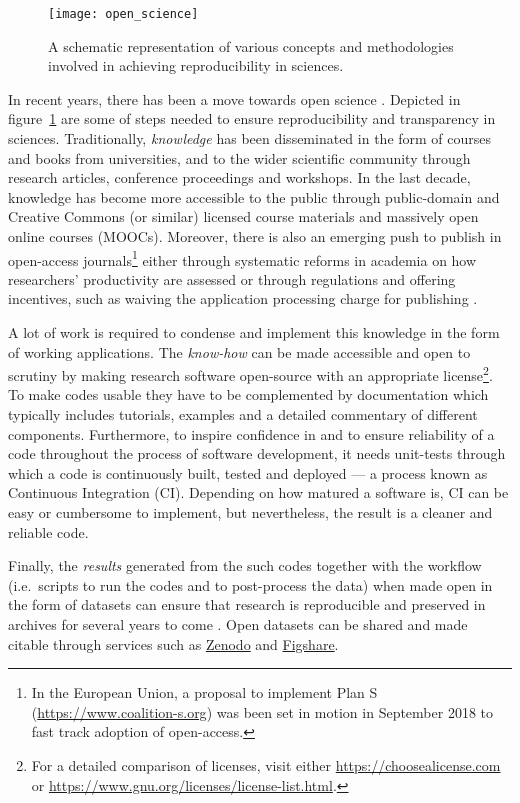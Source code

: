 \begin{figure}[h]
  \centering
  \texttt{[image: open\_science]}
  \caption{A schematic representation of various concepts and methodologies
  involved in achieving reproducibility in sciences.}\label{fig:opensci}
\end{figure}

In recent years, there has been a move towards open science
\citep[see the report by][]{royal_society_great_britain_science_2012}.
%
Depicted in figure~\ref{fig:opensci} are some of steps needed to ensure
reproducibility and transparency in sciences.
%
Traditionally, \emph{knowledge} has been disseminated in the form of courses
and books from universities, and to the wider scientific community through
research articles, conference proceedings and workshops.
%
In the last decade, knowledge has become more accessible to the public
through public-domain and Creative Commons (or similar) licensed course
materials and massively open online courses (MOOCs). Moreover, there is also an
emerging push to publish in open-access journals\footnote{In the European
  Union, a proposal to implement Plan S (\url{https://www.coalition-s.org}) was
  been set in motion in September 2018 to fast track adoption of open-access.
} either through systematic
reforms in academia on how researchers' productivity are assessed or through
regulations and offering incentives, such as waiving the application processing
charge for publishing \citep{nosek_promoting_2015}.

A lot of work is required to condense and implement this knowledge in the form
of working applications.
%
The \emph{know-how} can be made accessible and open to scrutiny by making
research software open-source with an appropriate license\footnote{For a
	detailed comparison of licenses, visit either
	\url{https://choosealicense.com} or
	\url{https://www.gnu.org/licenses/license-list.html}. }.
%
To make codes usable they have to be complemented by documentation which
typically includes tutorials, examples and a detailed commentary of different
components.
%
Furthermore, to inspire confidence in and to ensure reliability of a code
throughout the process of software development, it needs unit-tests through
which a code is continuously built, tested and deployed --- a process known as
Continuous Integration (CI). Depending on how matured a software is, CI can be
easy or cumbersome to implement, but nevertheless, the result is a cleaner and
reliable code.

Finally, the \emph{results} generated from the such codes together with the
workflow (i.e.\ scripts to run the codes and to post-process the data) when made
open in the form of datasets can ensure that research is reproducible and
preserved in archives for several years to come \citep{gewin_data_2016}. Open
datasets can be shared and made citable through services such as
\href{https://zenodo.org}{Zenodo} and \href{https://figshare.com}{Figshare}.

